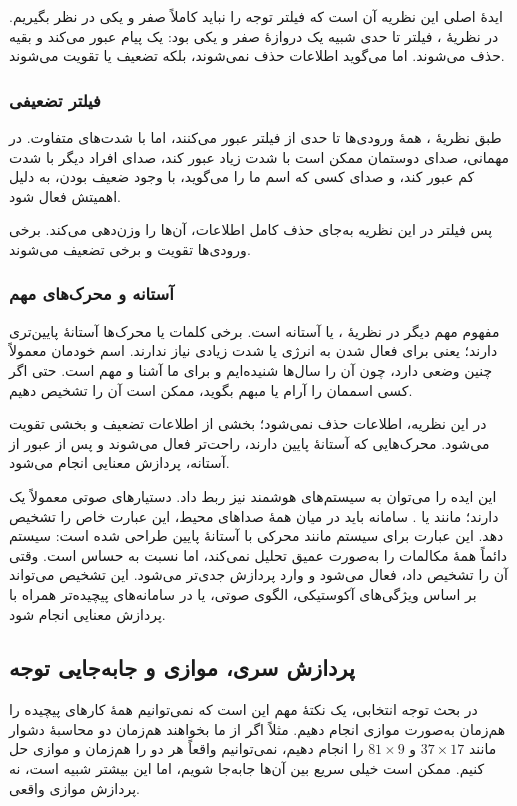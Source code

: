 ایدهٔ اصلی این نظریه آن است که فیلتر توجه را نباید کاملاً صفر و یکی در نظر بگیریم. در نظریهٔ ، فیلتر تا حدی شبیه یک دروازهٔ صفر و یکی بود: یک پیام عبور می‌کند و بقیه حذف می‌شوند. اما  می‌گوید اطلاعات حذف نمی‌شوند، بلکه تضعیف یا تقویت می‌شوند.

\subsubsection{فیلتر تضعیفی}
طبق نظریهٔ ، همهٔ ورودی‌ها تا حدی از فیلتر عبور می‌کنند، اما با شدت‌های متفاوت. در مهمانی، صدای دوستمان ممکن است با شدت زیاد عبور کند، صدای افراد دیگر با شدت کم عبور کند، و صدای کسی که اسم ما را می‌گوید، با وجود ضعیف بودن، به دلیل اهمیتش فعال شود.

پس فیلتر در این نظریه به‌جای حذف کامل اطلاعات، آن‌ها را وزن‌دهی می‌کند. برخی ورودی‌ها تقویت و برخی تضعیف می‌شوند.

\subsubsection{آستانه و محرک‌های مهم}
مفهوم مهم دیگر در نظریهٔ ،  یا آستانه است. برخی کلمات یا محرک‌ها آستانهٔ پایین‌تری دارند؛ یعنی برای فعال شدن به انرژی یا شدت زیادی نیاز ندارند. اسم خودمان معمولاً چنین وضعی دارد، چون آن را سال‌ها شنیده‌ایم و برای ما آشنا و مهم است. حتی اگر کسی اسممان را آرام یا مبهم بگوید، ممکن است آن را تشخیص دهیم.

در این نظریه، اطلاعات حذف نمی‌شود؛ بخشی از اطلاعات تضعیف و بخشی تقویت می‌شود. محرک‌هایی که آستانهٔ پایین دارند، راحت‌تر فعال می‌شوند و پس از عبور از آستانه، پردازش معنایی انجام می‌شود.

این ایده را می‌توان به سیستم‌های هوشمند نیز ربط داد. دستیارهای صوتی معمولاً یک  دارند؛ مانند  یا . سامانه باید در میان همهٔ صداهای محیط، این عبارت خاص را تشخیص دهد. این عبارت برای سیستم مانند محرکی با آستانهٔ پایین طراحی شده است: سیستم دائماً همهٔ مکالمات را به‌صورت عمیق تحلیل نمی‌کند، اما نسبت به  حساس است. وقتی آن را تشخیص داد، فعال می‌شود و وارد پردازش جدی‌تر می‌شود. این تشخیص می‌تواند بر اساس ویژگی‌های آکوستیکی، الگوی صوتی، یا در سامانه‌های پیچیده‌تر همراه با پردازش معنایی انجام شود.

\subsection{پردازش سری، موازی و جابه‌جایی توجه}
در بحث توجه انتخابی، یک نکتهٔ مهم این است که نمی‌توانیم همهٔ کارهای پیچیده را هم‌زمان به‌صورت موازی انجام دهیم. مثلاً اگر از ما بخواهند هم‌زمان دو محاسبهٔ دشوار مانند \(37 \times 17\) و \(81 \times 9\) را انجام دهیم، نمی‌توانیم واقعاً هر دو را هم‌زمان و موازی حل کنیم. ممکن است خیلی سریع بین آن‌ها جابه‌جا شویم، اما این بیشتر شبیه  است، نه پردازش موازی واقعی.

